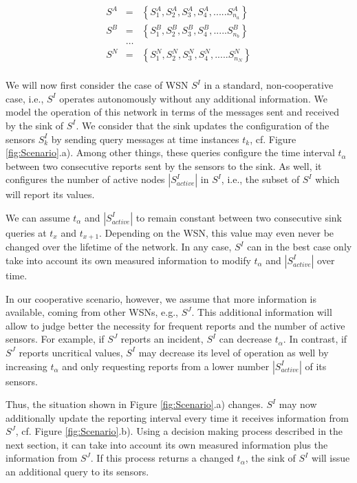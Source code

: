 \documentclass[onecolumn]{jaise2e}
\begin{document}
\begin{eqnarray*}
S^A & = & \left\{S^A_{1}, S^A_{2}, S^A_{3}, S^A_{4},..... S^A_{n_a}\right\} \\ 
S^B & = & \left\{S^B_{1}, S^B_{2}, S^B_{3}, S^B_{4},..... S^B_{n_b}\right\} \\
& \hdots & \\
S^N & = & \left\{S^N_{1}, S^N_{2}, S^N_{3}, S^N_{4},..... S^N_{n_N}\right\} \\
\end{eqnarray*}

We will now first consider the case of WSN $S^I$ in a standard, non-cooperative case, i.e., $S^I$ operates autonomously without any additional information. We model the operation of this network in terms of the messages sent and received by the sink of $S^I$. We consider that the sink updates the configuration of the sensors $S^I_k$ by sending query messages at time instances $t_k$, cf. Figure \ref{fig:Scenario}.a). Among other things, these queries configure the time interval $t_\alpha$ between two consecutive reports sent by the sensors to the sink. As well, it configures the number of active nodes $|S^{I}_{active}|$ in $S^I$, i.e., the subset of $S^I$ which will report its values.


We can assume $t_\alpha$ and $|S^{I}_{active}|$ to remain constant between two consecutive sink queries at $t_x$ and $t_{x+1}$. Depending on the WSN, this value may even never be changed over the lifetime of the network. In any case, $S^I$ can in the best case only take into account its own measured information to modify $t_\alpha$ and $|S^{I}_{active}|$ over time.

In our cooperative scenario, however, we assume that more information is available, coming from other WSNs, e.g., $S^J$. This additional information will allow to judge better the necessity for frequent reports and the number of active sensors. For example, if $S^J$ reports an incident, $S^I$ can decrease $t_\alpha$. In contrast, if $S^J$ reports uncritical values, $S^I$ may decrease its level of operation as well by increasing $t_\alpha$ and only requesting reports from a lower number $|S^{I}_{active}|$ of its sensors.

Thus, the situation shown in Figure \ref{fig:Scenario}.a) changes. $S^I$ may now additionally update the reporting interval every time it receives information from $S^J$, cf. Figure \ref{fig:Scenario}.b). Using a decision making process described in the next section, it can take into account its own measured information plus the information from $S^J$. If this process returns a changed $t_\alpha$, the sink of $S^I$ will issue an additional query to its sensors.
\end{document}

